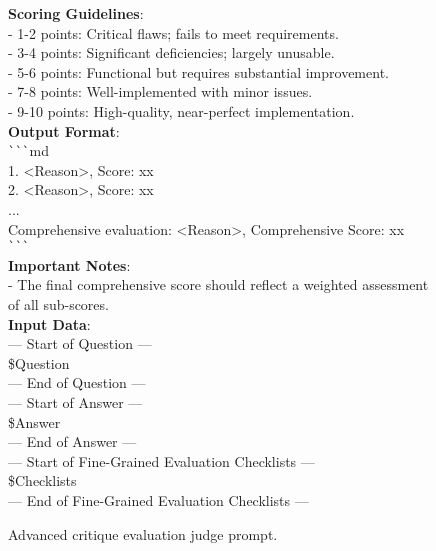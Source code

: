 \documentclass[11pt, a4paper, logo, copyright, nonumbering, amsart]{map}
\begin{document}
\begin{CJK*}{UTF8}{gbsn}
\begin{figure*}[h!]
\begin{center}
\begin{tcolorbox}[width=0.7\textwidth, colback=lightblue, title={\textbf{Advanced Critique Evaluation Judge Prompt}}]
    \textbf{Scoring Guidelines}:\\
    - 1-2 points: Critical flaws; fails to meet requirements.\\
    - 3-4 points: Significant deficiencies; largely unusable.\\
    - 5-6 points: Functional but requires substantial improvement.\\
    - 7-8 points: Well-implemented with minor issues.\\
    - 9-10 points: High-quality, near-perfect implementation.\\
    
    \textbf{Output Format}:\\
    \verb|```|md\\
    1. <Reason>, Score: xx\\
    2. <Reason>, Score: xx\\
    ...\\
    Comprehensive evaluation: <Reason>, Comprehensive Score: xx\\
    \verb|```|\\
    
    \textbf{Important Notes}:\\
    - The final comprehensive score should reflect a weighted assessment of all sub-scores.\\
    
    \textbf{Input Data}:\\
    --- Start of Question ---\\
    \textcolor{ora}{\$Question}\\
    --- End of Question ---\\
    
    --- Start of Answer ---\\
    \textcolor{ora}{\$Answer}\\
    --- End of Answer ---\\
    
    --- Start of Fine-Grained Evaluation Checklists ---\\ 
    \textcolor{ora}{\$Checklists}\\
    --- End of Fine-Grained Evaluation Checklists ---\\

    \end{tcolorbox}
\end{center}
\caption{Advanced critique evaluation judge prompt.} \label{ap:prompt_level2}
\end{figure*}

\begin{figure*}[h!]
\begin{center}
    \fontsize{8.4}{8.4} \selectfont
    \begin{tcolorbox}[width=1\textwidth, colback=lightblue, title={\textbf{Full Error Typelists}}]


\end{tcolorbox}
\end{center}
\end{figure*}
\end{CJK*}
\end{document}
